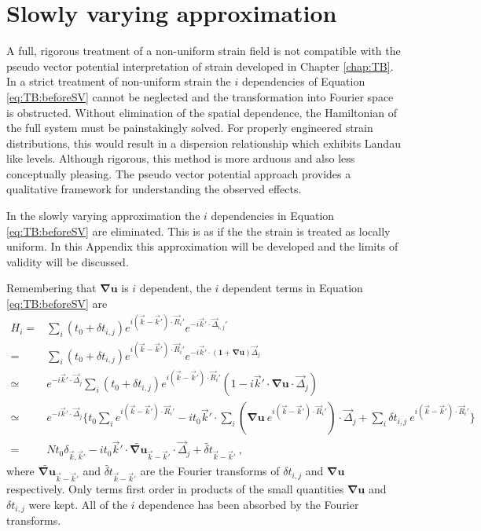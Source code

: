 \chapter{Slowly varying approximation \label{chap:idep}}

A full, rigorous treatment of a non-uniform strain field is not compatible with the pseudo vector potential interpretation of strain developed in Chapter \ref{chap:TB}.
In a strict treatment of non-uniform strain the $i$ dependencies of Equation \ref{eq:TB:beforeSV} cannot be neglected and the transformation into Fourier space is obstructed.
Without elimination of the spatial dependence, the Hamiltonian of the full system must be painstakingly solved.
For properly engineered strain distributions, this would result in a dispersion relationship which exhibits Landau like levels.
Although rigorous, this method is more arduous and also less conceptually pleasing.
The pseudo vector potential approach provides a qualitative framework for understanding the observed effects.

In the slowly varying approximation the $i$ dependencies in Equation \ref{eq:TB:beforeSV} are eliminated.
This is as if the the strain is treated as locally uniform.
In this Appendix this approximation will be developed and the limits of validity will be discussed.

Remembering that $\bm{\nabla u}$ is $i$ dependent, the $i$ dependent terms in Equation \ref{eq:TB:beforeSV} are 
\begin{align*}
  H_i=&\sum_i \left( t_0+\delta t_{i,j} \right) e^{i(\vec{k}-\vec{k}')\cdot \vec{R}_i'}
  		e^{-i \vec{k}' \cdot \vec{\Delta}_{i,j}'} \\
  	 =&\sum_i \left( t_0+\delta t_{i,j} \right) e^{i(\vec{k}-\vec{k}')\cdot \vec{R}_i'}
  		e^{-i \vec{k}' \cdot (\bm{1}+\bm{\nabla u}) \vec{\Delta}_j} \\
  	 \simeq & e^{-i \vec{k}' \cdot \vec{\Delta}_j} \sum_i \left( t_0+\delta t_{i,j} \right)
  	 	e^{i(\vec{k}-\vec{k}')\cdot \vec{R}_i'} \left(1-i \vec{k}' \cdot \bm{\nabla u} \cdot \vec{\Delta}_j \right) \\
  	 \simeq & e^{-i \vec{k}' \cdot \vec{\Delta}_j} \bigg \{
  	 	t_0 \sum_i e^{i(\vec{k}-\vec{k}')\cdot \vec{R}_i'} 
  	 	-i t_0 \vec{k}' \cdot \sum_i \left( \bm{\nabla u} \ e^{i(\vec{k}-\vec{k}')\cdot \vec{R}_i'} \right) \cdot \vec{\Delta}_j
  	 	+\sum_i \delta t_{i,j} \  e^{i(\vec{k}-\vec{k}')\cdot \vec{R}_i'}
  	 	\bigg \} \\
  	 =& N t_0 \delta_{\vec{k},\vec{k}'}
  	 	-i t_0 \vec{k}' \cdot \widetilde{\bm{\nabla u}}_{\vec{k}-\vec{k}'} \cdot \vec{\Delta}_j + \widetilde{\delta t}_{\vec{k}-\vec{k}'} \ ,
\end{align*}
where $\widetilde{\bm{\nabla u}}_{\vec{k}-\vec{k}'}$ and $\widetilde{\delta t}_{\vec{k}-\vec{k}'}$ are the Fourier transforms of $\delta t_{i,j}$ and $\bm{\nabla u}$ respectively.
Only terms first order in products of the small quantities $\bm{\nabla u}$ and $\delta t_{i,j}$ were kept.
All of the $i$ dependence has been absorbed by the Fourier transforms.

